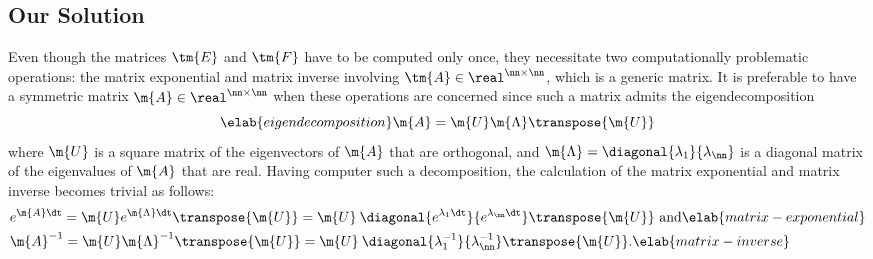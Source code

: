 \subsection{Our Solution}

Even though the matrices $\tm{E}$ and $\tm{F}$ have to be computed only once,
they necessitate two computationally problematic operations: the matrix
exponential and matrix inverse involving $\tm{A} \in \real^{\nn \times \nn}$,
which is a generic matrix. It is preferable to have a symmetric matrix $\m{A}
\in \real^{\nn \times \nn}$ when these operations are concerned since such a
matrix admits the eigendecomposition \cite{press2007}
\begin{equation} \elab{eigendecomposition}
  \m{A} = \m{U} \m{\Lambda} \transpose{\m{U}}
\end{equation}
where $\m{U}$ is a square matrix of the eigenvectors of $\m{A}$ that are
orthogonal, and $\m{\Lambda} = \diagonal{\lambda_1}{\lambda_\nn}$ is a diagonal
matrix of the eigenvalues of $\m{A}$ that are real. Having computer such a
decomposition, the calculation of the matrix exponential and matrix inverse
becomes trivial as follows:
\begin{align}
  & e^{\m{A} \dt}
  = \m{U} e^{\m{\Lambda} \dt} \transpose{\m{U}}
  = \m{U} \: \diagonal{e^{\lambda_1 \dt}}{e^{\lambda_\nn \dt}} \transpose{\m{U}} \text{ and} \elab{matrix-exponential} \\
  & \m{A}^{-1}
  = \m{U} \m{\Lambda}^{-1} \transpose{\m{U}}
  = \m{U} \: \diagonal{\lambda_1^{-1}}{\lambda_\nn^{-1}} \transpose{\m{U}}. \elab{matrix-inverse}
\end{align}

